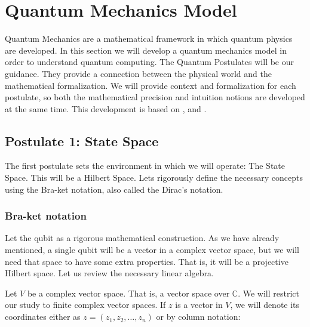 
\chapter{Quantum Mechanics Model}


Quantum Mechanics are a mathematical framework in which quantum physics are developed. In this section we will develop a quantum mechanics model in order to understand quantum computing. The Quantum Postulates will be our guidance. They provide a connection between the physical world and the mathematical formalization. We will provide context and formalization for each postulate, so both the mathematical precision and intuition notions are developed at the same time. This development is based on \cite{Nielsen2002}, \cite{Manzano2020} and \cite{Bayens2019}.


\section{Postulate 1: State Space}


The first postulate sets the environment in which we will operate: The State Space. This will be a Hilbert Space. Lets rigorously define the necessary concepts using the Bra-ket notation, also called the Dirac's notation.


\subsection{Bra-ket notation}


Let the qubit as a rigorous mathematical construction. As we have already mentioned, a single qubit will be a vector in a complex vector space, but we will need that space to have some extra properties. That is, it will be a projective Hilbert space. Let us review the necessary linear algebra.

Let $V$ be a complex vector space. That is, a vector space over $\mathds{C}$. We will restrict our study to finite complex vector spaces. If $z$ is a vector in $V$, we will denote its coordinates either as $z = (z_1, z_2, \dotsc, z_n)$ or by column notation:

